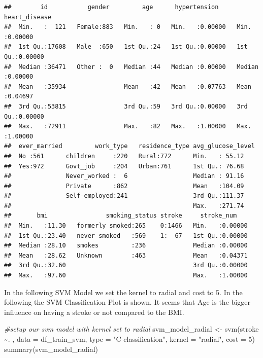 \documentclass[
]{article}
\newenvironment{Shaded}{\begin{snugshade}}{\end{snugshade}}
\newcommand{\AttributeTok}[1]{\textcolor[rgb]{0.77,0.63,0.00}{#1}}
\newcommand{\CommentTok}[1]{\textcolor[rgb]{0.56,0.35,0.01}{\textit{#1}}}
\newcommand{\DecValTok}[1]{\textcolor[rgb]{0.00,0.00,0.81}{#1}}
\newcommand{\FunctionTok}[1]{\textcolor[rgb]{0.00,0.00,0.00}{#1}}
\newcommand{\NormalTok}[1]{#1}
\newcommand{\OtherTok}[1]{\textcolor[rgb]{0.56,0.35,0.01}{#1}}
\newcommand{\SpecialCharTok}[1]{\textcolor[rgb]{0.00,0.00,0.00}{#1}}
\newcommand{\StringTok}[1]{\textcolor[rgb]{0.31,0.60,0.02}{#1}}
\renewcommand{\=}[1]{\stackrel{#1}{=}}
\theoremstyle{definition}
\theoremstyle{remark}
\begin{document}
\begin{verbatim}
##        id           gender         age      hypertension     heart_disease    
##  Min.   :  121   Female:883   Min.   : 0   Min.   :0.00000   Min.   :0.00000  
##  1st Qu.:17608   Male  :650   1st Qu.:24   1st Qu.:0.00000   1st Qu.:0.00000  
##  Median :36471   Other :  0   Median :44   Median :0.00000   Median :0.00000  
##  Mean   :35934                Mean   :42   Mean   :0.07763   Mean   :0.04697  
##  3rd Qu.:53815                3rd Qu.:59   3rd Qu.:0.00000   3rd Qu.:0.00000  
##  Max.   :72911                Max.   :82   Max.   :1.00000   Max.   :1.00000  
##  ever_married         work_type   residence_type avg_glucose_level
##  No :561      children     :220   Rural:772      Min.   : 55.12   
##  Yes:972      Govt_job     :204   Urban:761      1st Qu.: 76.68   
##               Never_worked :  6                  Median : 91.16   
##               Private      :862                  Mean   :104.09   
##               Self-employed:241                  3rd Qu.:111.37   
##                                                  Max.   :271.74   
##       bmi                smoking_status stroke     stroke_num     
##  Min.   :11.30   formerly smoked:265    0:1466   Min.   :0.00000  
##  1st Qu.:23.40   never smoked   :569    1:  67   1st Qu.:0.00000  
##  Median :28.10   smokes         :236             Median :0.00000  
##  Mean   :28.62   Unknown        :463             Mean   :0.04371  
##  3rd Qu.:32.60                                   3rd Qu.:0.00000  
##  Max.   :97.60                                   Max.   :1.00000
\end{verbatim}

In the following SVM Model we set the kernel to radial and cost to 5. In the following the SVM Classification Plot is shown. It seems that Age is the bigger influence on having a stroke or not compared to the BMI.

\begin{Shaded}
\begin{Highlighting}[]
\CommentTok{\#setup our svm model with kernel set to radial}
\NormalTok{svm\_model\_radial }\OtherTok{\textless{}{-}} \FunctionTok{svm}\NormalTok{(stroke }\SpecialCharTok{\textasciitilde{}}\NormalTok{. , }\AttributeTok{data =}\NormalTok{ df\_train\_svm, }\AttributeTok{type =} \StringTok{"C{-}classification"}\NormalTok{, }\AttributeTok{kernel =} \StringTok{"radial"}\NormalTok{, }\AttributeTok{cost =} \DecValTok{5}\NormalTok{)}
\FunctionTok{summary}\NormalTok{(svm\_model\_radial)}
\end{Highlighting}
\end{Shaded}
\end{document}
